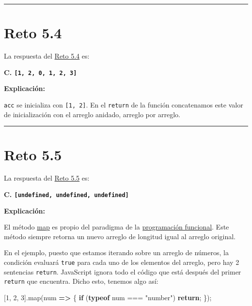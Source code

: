 \documentclass[
  letterpaper,
  DIV=11,
  numbers=noendperiod]{scrreprt}
\newenvironment{Shaded}{\begin{snugshade}}{\end{snugshade}}
\newcommand{\ControlFlowTok}[1]{\textcolor[rgb]{0.00,0.23,0.31}{\textbf{#1}}}
\newcommand{\DecValTok}[1]{\textcolor[rgb]{0.68,0.00,0.00}{#1}}
\newcommand{\FunctionTok}[1]{\textcolor[rgb]{0.28,0.35,0.67}{#1}}
\newcommand{\KeywordTok}[1]{\textcolor[rgb]{0.00,0.23,0.31}{\textbf{#1}}}
\newcommand{\NormalTok}[1]{\textcolor[rgb]{0.00,0.23,0.31}{#1}}
\newcommand{\OperatorTok}[1]{\textcolor[rgb]{0.37,0.37,0.37}{#1}}
\newcommand{\StringTok}[1]{\textcolor[rgb]{0.13,0.47,0.30}{#1}}
\begin{document}
\begin{center}\rule{0.5\linewidth}{0.5pt}\end{center}

\section{Reto 5.4}\label{sec-sol-cap5-reto4}

La respuesta del \hyperref[sec-cap5-reto4]{Reto 5.4} es:

\textbf{C. \texttt{{[}1,\ 2,\ 0,\ 1,\ 2,\ 3{]}}}

\textbf{Explicación:}

\texttt{acc} se inicializa con \texttt{{[}1,\ 2{]}}. En el
\texttt{return} de la función concatenamos este valor de inicialización
con el arreglo anidado, arreglo por arreglo.

\begin{center}\rule{0.5\linewidth}{0.5pt}\end{center}

\section{Reto 5.5}\label{sec-sol-cap5-reto5}

La respuesta del \hyperref[sec-cap5-reto5]{Reto 5.5} es:

\textbf{C. \texttt{{[}undefined,\ undefined,\ undefined{]}}}

\textbf{Explicación:}

El método \hyperref[glos-map]{map} es propio del paradigma de la
\hyperref[glos-programaciuxf3n-funcional]{programación funcional}. Este
método siempre retorna un nuevo arreglo de longitud igual al arreglo
original.

En el ejemplo, puesto que estamos iterando sobre un arreglo de números,
la condición evaluará \texttt{true} para cada uno de los elementos del
arreglo, pero hay 2 sentencias \texttt{return}. JavaScript ignora todo
el código que está después del primer \texttt{return} que encuentra.
Dicho esto, tenemos algo así:

\begin{Shaded}
\begin{Highlighting}[]
\NormalTok{[}\DecValTok{1}\OperatorTok{,} \DecValTok{2}\OperatorTok{,} \DecValTok{3}\NormalTok{]}\OperatorTok{.}\FunctionTok{map}\NormalTok{(num }\KeywordTok{=\textgreater{}}\NormalTok{ \{}
  \ControlFlowTok{if}\NormalTok{ (}\KeywordTok{typeof}\NormalTok{ num }\OperatorTok{===} \StringTok{"number"}\NormalTok{) }\ControlFlowTok{return}\OperatorTok{;}
\NormalTok{\})}\OperatorTok{;}
\end{Highlighting}
\end{Shaded}
\end{document}
